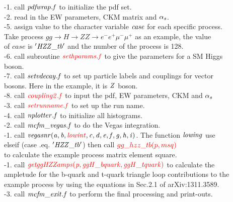 \documentclass[epsf,preprint,aps,12pt,showpacs,nofootinbib,tightenlines]{revtex4}
\begin{document}
\quad\quad\quad\quad\quad\quad{}-1. call $\it{pdfwrap.f}$ to initialize the pdf set.\\
\quad\quad\quad\quad\quad\quad{}-2. read in the EW parameters, CKM matrix and $\it{\alpha_s}$.\\
\quad\quad\quad\quad\quad{}-5.  assign value to the character variable $\it{case}$ for each specific  process. \\ \quad\quad\quad\quad\quad\quad\quad\quad Take process $gg \to H \to ZZ \to e^-e^+\mu^-\mu^+$ as an example, the value \\ \quad\quad\quad\quad\quad\quad\quad\quad of $case$ is $\it{'HZZ\_tb'}$ and the number of the process is 128.\\
\quad\quad\quad\quad\quad{}-6. call subroutine ${\color{red}\it{sethparams.f}}$ to give the parameters for a SM Higgs \\ \quad\quad\quad\quad\quad\quad\quad\quad boson.\\
\quad\quad\quad\quad\quad{}-7. call $\it{setvdecay.f}$ to set up particle labels and couplings for vector \\ \quad\quad\quad\quad\quad\quad\quad\quad bosons. Here in the example, it is $\it{Z}$ boson.\\
\quad\quad\quad\quad\quad{}-8. call ${\color{red}\it{coupling2.f}}$ to input the pdf, EW parameters, CKM and $\it{\alpha_s}$\\

\quad\quad\quad{}-3. call ${\color{red}\it{setrunname.f}}$ to set up the run name.\\
\quad\quad\quad{}-4. call $\it{nplotter.f}$ to initialize all histograms.\\
\quad\quad{}-2. call $\it{mcfm\_vegas.f}$ to do the Vegas integration.\\
\quad\quad\quad{}-1. call $\it{vegasnr(a,b,{\color{red}lowint},c,d,e,f,g,h,i)}$. The function $\it{lowing}$ use \\ \quad\quad\quad\quad\quad\quad\quad \quad \quad elseif (case .eq. $\it{'HZZ\_tb'}$) then call ${\color{red}gg\_hzz\_tb(p,msq)}$\\  \quad\quad\quad\quad\quad\quad to calculate the example process matrix element square. \\
\quad\quad\quad\quad{}-1.  call ${\color{red}\it{getggHZZamps(p,ggH\_bquark,ggH\_tquark)}}$ to calculate the \\
\quad\quad\quad\quad\quad\quad\quad ampletude for the b-quark and t-quark triangle loop contributions to the\\
\quad\quad\quad\quad\quad\quad\quad example process by using the equations in Sec.2.1 of arXiv:1311.3589.\\

\quad\quad{}-3. call $\it{mcfm\_exit.f}$ to perform the final processing and print-outs.\\
\end{document}
